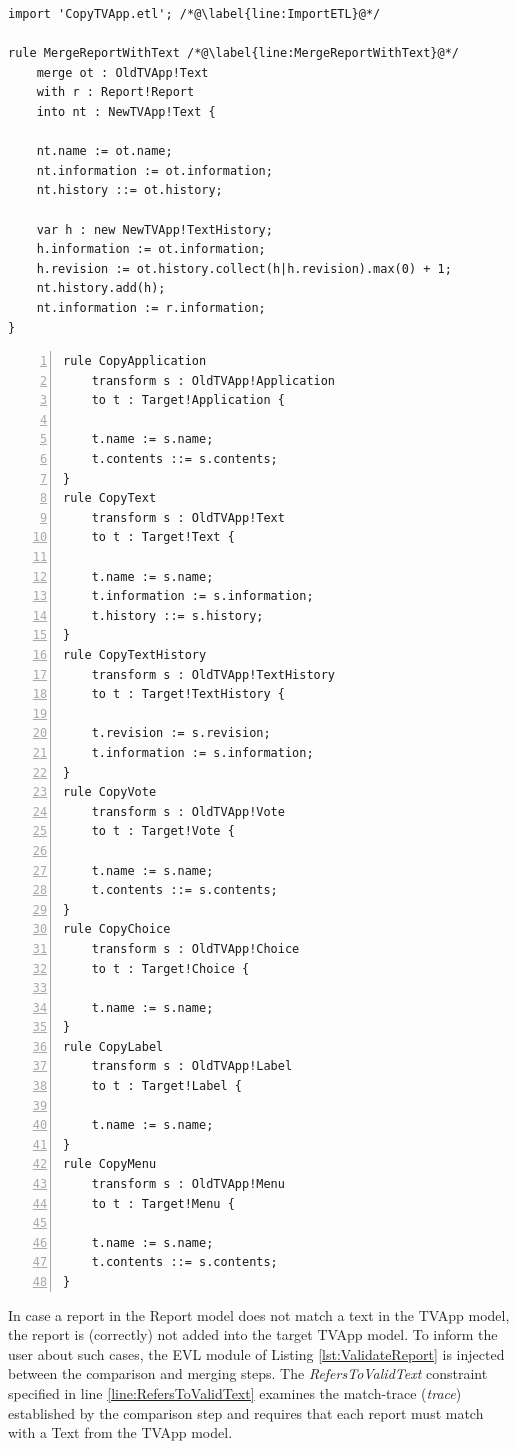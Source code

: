 \begin{lstlisting}[basicstyle=\ttfamily\footnotesize, nolol=true, flexiblecolumns=true, caption=EML module that merges a TVApp with a Report model, tabsize=2, label=lst:CaseStudyEML, language=EML]
import 'CopyTVApp.etl'; /*@\label{line:ImportETL}@*/

rule MergeReportWithText /*@\label{line:MergeReportWithText}@*/
	merge ot : OldTVApp!Text
	with r : Report!Report 
	into nt : NewTVApp!Text {
	
	nt.name := ot.name;
	nt.information := ot.information;
	nt.history ::= ot.history;
	
	var h : new NewTVApp!TextHistory;
	h.information := ot.information;
	h.revision := ot.history.collect(h|h.revision).max(0) + 1;
	nt.history.add(h);
	nt.information := r.information;
}
\end{lstlisting}

\begin{lstlisting}[basicstyle=\ttfamily\footnotesize, flexiblecolumns=true, numbers=left, nolol=true, caption=ETL transformation that copies a TVApp module, label=lst:CaseStudyCopyETL, language=ETL, tabsize=2]
rule CopyApplication
	transform s : OldTVApp!Application
	to t : Target!Application {
	
	t.name := s.name;
	t.contents ::= s.contents;
}
rule CopyText
	transform s : OldTVApp!Text
	to t : Target!Text {

	t.name := s.name;
	t.information := s.information;
	t.history ::= s.history;
}
rule CopyTextHistory
	transform s : OldTVApp!TextHistory
	to t : Target!TextHistory {

	t.revision := s.revision;
	t.information := s.information;
}
rule CopyVote
	transform s : OldTVApp!Vote
	to t : Target!Vote {

	t.name := s.name;
	t.contents ::= s.contents;
}
rule CopyChoice
	transform s : OldTVApp!Choice
	to t : Target!Choice {

	t.name := s.name;
}
rule CopyLabel
	transform s : OldTVApp!Label
	to t : Target!Label {

	t.name := s.name;
}
rule CopyMenu
	transform s : OldTVApp!Menu
	to t : Target!Menu {
	
	t.name := s.name;
	t.contents ::= s.contents;
}
\end{lstlisting}

In case a report in the Report model does not match a text in the TVApp model, the report is (correctly) not added into the target TVApp model. To inform the user about such cases, the EVL module of Listing \ref{lst:ValidateReport} is injected between the comparison and merging steps. The \emph{RefersToValidText} constraint specified in line \ref{line:RefersToValidText} examines the match-trace (\emph{trace}) established by the comparison step and requires that each report must match with a Text from the TVApp model.

